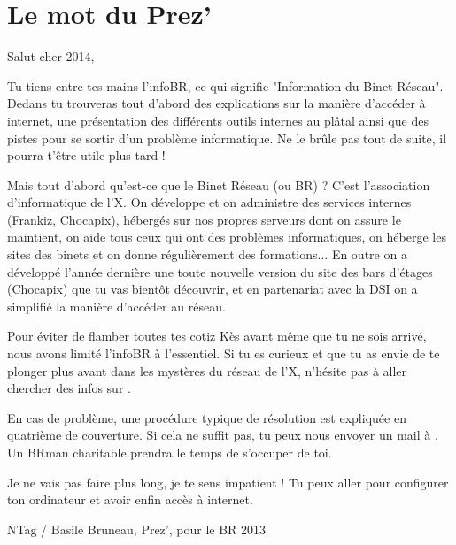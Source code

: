 \thispagestyle{empty}

\section*{Le mot du Prez'}

\vspace{1em}

Salut cher 2014,
\vspace{0.5em}

Tu tiens entre tes mains l'infoBR, ce qui signifie "Information du Binet Réseau". Dedans tu trouveras tout d'abord des explications sur la manière d'accéder à internet, une présentation des différents outils internes au plâtal ainsi que des pistes pour se sortir d'un problème informatique. Ne le brûle pas tout de suite, il pourra t'être utile plus tard !

Mais tout d'abord qu'est-ce que le Binet Réseau (ou BR) ? C'est l'association d'informatique de l'X. On développe et on administre des services internes (Frankiz, Chocapix), hébergés sur nos propres serveurs dont on assure le maintient, on aide tous ceux qui ont des problèmes informatiques, on héberge les sites des binets et on donne régulièrement des formations... En outre on a développé l'année dernière une toute nouvelle version du site des bars d'étages (Chocapix) que tu vas bientôt découvrir, et en partenariat avec la DSI on a simplifié la manière d'accéder au réseau.

Pour éviter de flamber toutes tes cotiz Kès avant même que tu ne sois arrivé, nous avons limité l'infoBR à l'essentiel. Si tu es curieux et que tu as envie de te plonger plus avant dans les mystères du réseau de l'X, n'hésite pas à aller chercher des infos sur .

\vspace{1em}
En cas de problème, une procédure typique de résolution est expliquée en quatrième de couverture. Si cela ne suffit pas, tu peux nous envoyer un mail à . Un BRman charitable prendra le temps de s'occuper de toi.

Je ne vais pas faire plus long, je te sens impatient ! Tu peux aller \pageref{ip} pour configurer ton ordinateur et avoir enfin accès à internet.

\vspace{2.5em}
\hfill NTag / Basile Bruneau, Prez', pour le BR 2013


\vfill


